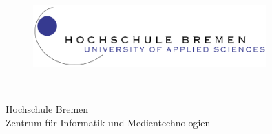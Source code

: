 \thispagestyle{empty}


\begin{figure}[t]
	\centering
	\includegraphics[width=0.8\textwidth]{abb/logo}
\end{figure}


\begin{verbatim}


\end{verbatim}

\begin{center}
	\Large{Hochschule Bremen}\\
	\Large{Zentrum für Informatik und Medientechnologien}\\
\end{center}


